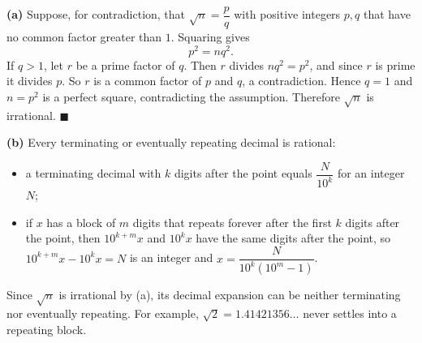 \textbf{(a)} Suppose, for contradiction, that $\sqrt n=\dfrac pq$ with positive integers $p,q$ that have no common factor greater than $1$. Squaring gives
\[p^2=nq^2.\]
If $q>1$, let $r$ be a prime factor of $q$. Then $r$ divides $nq^2=p^2$, and since $r$ is prime it divides $p$. So $r$ is a common factor of $p$ and $q$, a contradiction. Hence $q=1$ and $n=p^2$ is a perfect square, contradicting the assumption. Therefore $\sqrt n$ is irrational. $\blacksquare$

\textbf{(b)} Every terminating or eventually repeating decimal is rational:
\begin{itemize}
\item a terminating decimal with $k$ digits after the point equals $\dfrac{N}{10^k}$ for an integer $N$;
\item if $x$ has a block of $m$ digits that repeats forever after the first $k$ digits after the point, then $10^{k+m}x$ and $10^kx$ have the same digits after the point, so $10^{k+m}x-10^kx=N$ is an integer and $x=\dfrac{N}{10^k\left(10^m-1\right)}$.
\end{itemize}
Since $\sqrt n$ is irrational by (a), its decimal expansion can be neither terminating nor eventually repeating. For example, $\sqrt2=1.41421356\ldots$ never settles into a repeating block.
